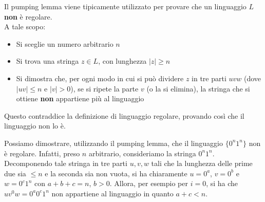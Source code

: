\documentclass[12pt, a4paper]{report}
\begin{document}
                Il pumping lemma viene tipicamente utilizzato per provare che un linguaggio $L$ \textbf{non} è regolare.\\
                A tale scopo: \begin{itemize}
                    \item Si sceglie un numero arbitrario $n$
                    \item Si trova una stringa $z\in L$, con lunghezza $|z|\geq n$
                    \item Si dimostra che, per ogni modo in cui si può dividere $z$ in tre parti $uvw$ (dove $|uv|\leq n$ e $|v|>0$), se si ripete la parte $v$ (o la si elimina), la stringa che si ottiene \textbf{non} appartiene più al linguaggio
                \end{itemize}
                Questo contraddice la definizione di linguaggio regolare, provando così che il linguaggio non lo è.
                \begin{example}
                    Possiamo dimostrare, utilizzando il pumping lemma, che il linguaggio $\{0^n1^n\}$ non è regolare. Infatti, preso $n$ arbitrario, consideriamo la stringa $0^n1^n$. Decomponendo tale stringa in tre parti $u, v, w$ tali che la lunghezza delle prime due sia $\leq n$ e la seconda sia non vuota, si ha chiaramente $u = 0^a$, $v = 0^b$ e $w = 0^c1^n$ con $a+b+c = n$, $b > 0$. Allora, per esempio per $i = 0$, si ha che $uv^0w = 0^a0^c1^n$ non appartiene al linguaggio in quanto $a+c < n$.
                \end{example}
\end{document}
